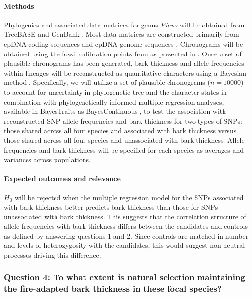 \paragraph{Methods} Phylogenies and associated data matrices for genus \emph{Pinus} will be obtained from 
TreeBASE \citep{Morell:to} and GenBank \citep{Benson:2012kf}. Most data matrices are constructed primarily from 
cpDNA coding sequences \citep{Eckert:2006iw, Gernandt:2008df} and cpDNA genome sequences \citep{Parks:2009bd}. 
Chronograms will be obtained using the fossil calibration points from \citet{Willyard:2007in} as presented in \citet{He:2012bz}. 
Once a set of plausible chronograms has been 
generated, bark thickness and allele frequencies within lineages will be reconstructed as quantitative 
characters using a Bayesian method \citep{Pagel:2004ic}.
Specifically, we will utilize a set of plausible chronograms ($n =  \num{10000}$) to account for uncertainty in 
phylogenetic tree and the character states in combination with phylogenetically informed multiple 
regression analyses, available in BayesTraits as BayesContinuous \citep{Pagel:2004ic},  to test the association with 
reconstructed SNP allele frequencies and bark thickness for two types of SNPs: those shared across 
all four species and associated with bark thickness versus those shared across all four species and 
unassociated with bark thickness. Allele frequencies and bark thickness will be specified for each species 
as averages and variances across populations.

\paragraph{Expected outcomes and relevance} $H_0$ will be rejected when the multiple regression model for the 
SNPs associated with bark thickness better predicts bark thickness than those for SNPs unassociated with bark thickness. 
This suggests that the correlation structure of allele frequencies with bark thickness differs between the candidates and controls 
as defined by answering questions 1 and 2. Since controls are matched in number and levels of heterozygosity with the candidates, 
this would suggest non-neutral processes driving this difference.

\subsubsection*{Question 4: To what extent is natural selection maintaining the fire-adapted bark thickness in these focal species?}

